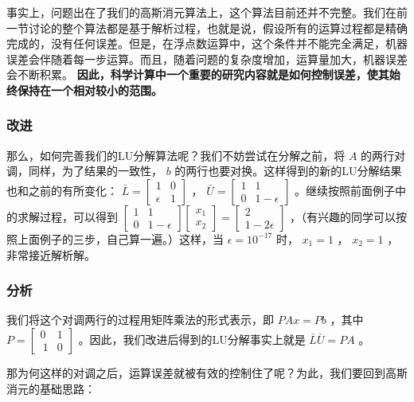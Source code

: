 事实上，问题出在了我们的高斯消元算法上，这个算法目前还并不完整。我们在前一节讨论的整个算法都是基于解析过程，也就是说，假设所有的运算过程都是精确完成的，没有任何误差。但是，在浮点数运算中，这个条件并不能完全满足，机器误差会伴随着每一步运算。而且，随着问题的复杂度增加，运算量加大，机器误差会不断积累。 \textbf{因此，科学计算中一个重要的研究内容就是如何控制误差，使其始终保持在一个相对较小的范围。}

\subsubsection{改进}

那么，如何完善我们的LU分解算法呢？我们不妨尝试在分解之前，将  $A$  的两行对调，同样，为了结果的一致性，  $b $  的两行也要对换。这样得到的新的LU分解结果也和之前的有所变化：  $\bar{L}=\begin{bmatrix} 1& 0\\ {\epsilon} & 1 \end{bmatrix}$  ，  $\bar{U}=\begin{bmatrix} 1& 1\\ 0 & 1-{\epsilon} \end{bmatrix}$  。继续按照前面例子中的求解过程，可以得到  $\begin{bmatrix} 1& 1\\ 0 &1-{\epsilon}  \end{bmatrix} \begin{bmatrix} x_1\\ x_2 \end{bmatrix}= \begin{bmatrix} 2\\ 1-2{\epsilon} \end{bmatrix}$  ，（有兴趣的同学可以按照上面例子的三步，自己算一遍。）这样，当  $\epsilon=10^{-17}$  时，  $x_1=1$  ，  $x_2=1$  ，非常接近解析解。

\subsubsection{分析}

我们将这个对调两行的过程用矩阵乘法的形式表示，即  $PAx=Pb$  ，其中  $P=\begin{bmatrix} 0&1\\\ 1&0 \end{bmatrix}$  。因此，我们改进后得到的LU分解事实上就是  $\bar{L}\bar{U}=PA$  。

那为何这样的对调之后，运算误差就被有效的控制住了呢？为此，我们要回到高斯消元的基础思路：

